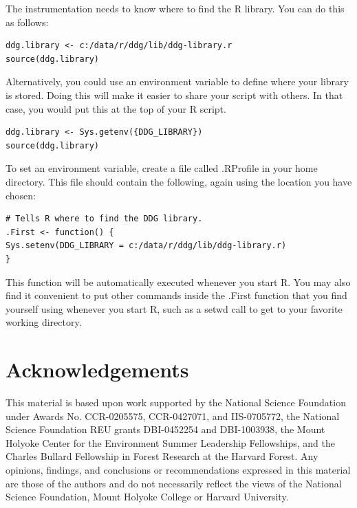 \documentclass[12pt]{article}
\begin{document}
{{\mdseries\upshape\color{black}
The instrumentation needs to know where to find the R library. You can do this as follows:}

\begin{lstlisting}
ddg.library <- c:/data/r/ddg/lib/ddg-library.r
source(ddg.library)
\end{lstlisting}

{\mdseries\upshape\color{black}
Alternatively, you could use an environment variable to define where your library is stored. Doing this will make it easier to share your script with others. In that case, you would put this at the top of your R script.}

\begin{lstlisting}
ddg.library <- Sys.getenv({DDG_LIBRARY})
source(ddg.library)
\end{lstlisting}

{\mdseries\upshape\color{black}
To set an environment variable, create a file called .RProfile in your home directory. This file should contain the following, again using the location you have chosen:}

\begin{lstlisting}
# Tells R where to find the DDG library.
.First <- function() {
Sys.setenv(DDG_LIBRARY = c:/data/r/ddg/lib/ddg-library.r)
}
\end{lstlisting}

{\mdseries\upshape\color{black}
This function will be automatically executed whenever you start R. You may also find it convenient to put other commands inside the .First function that you find yourself using whenever you start R, such as a setwd call to get to your favorite working directory. }

\section[Acknowledgements]{Acknowledgements}
{\mdseries\upshape\color{black}
This material is based upon work supported by the National Science Foundation under Awards No. CCR-0205575, CCR-0427071, and IIS-0705772, the National Science Foundation REU grants DBI-0452254 and DBI-1003938, the Mount Holyoke Center for the Environment Summer Leadership Fellowships, and the Charles Bullard Fellowship in Forest Research at the Harvard Forest. Any opinions, findings, and conclusions or recommendations expressed in this material are those of the authors and do not necessarily reflect the views of the National Science Foundation, Mount Holyoke College or Harvard University.}

}
\end{document}
